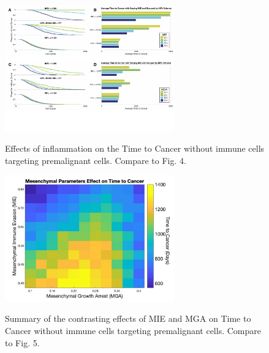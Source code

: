\documentclass[11pt, a4paper, preprint]{article}
\begin{document}
\begin{figure}
\center
{\includegraphics[width=0.65\textwidth]{../Figs/Figure4/Figure4_first.pdf}}
\caption{
Effects of inflammation on the Time to Cancer without immune cells targeting premalignant cells. Compare to Fig. 4.
}
\label{fig:4_first}
\end{figure}

\begin{figure}
\center
{\includegraphics[width=0.65\textwidth]{../Figs/Figure5/MIEvsMGA_bigcbar.jpg}}
\caption{
Summary of the contrasting effects of MIE and MGA on Time to Cancer without immune cells targeting premalignant cells. Compare to Fig. 5.
}
\label{fig:5_first}
\end{figure}
\end{document}
